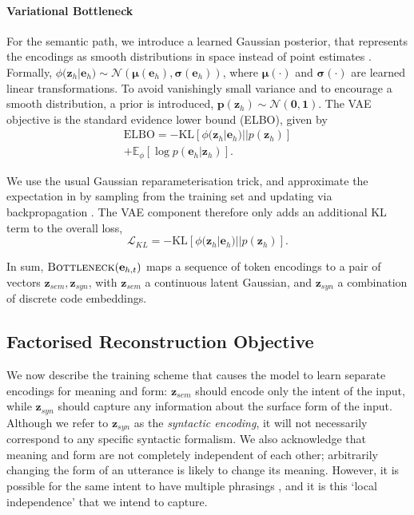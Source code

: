 \documentclass[11pt,a4paper]{article}
\begin{document}
\paragraph{Variational Bottleneck}

For the semantic path, we introduce a learned Gaussian posterior, that
represents the encodings as smooth distributions in space instead of
point estimates \cite{kingma2013autoencoding}.  Formally,
${\phi(\textbf{z}_h} | \textbf{e}_h ) \sim
\mathcal{N}(\boldsymbol{\mu}(\textbf{e}_h),
\boldsymbol{\sigma}(\textbf{e}_h))$, where $\boldsymbol{\mu} ( \cdot
)$ and $\boldsymbol{\sigma} ( \cdot )$ are learned linear
transformations. To avoid vanishingly small variance and to encourage
a smooth distribution, a prior is introduced,
$\textbf{p}(\textbf{z}_h) \sim \mathcal{N}(\textbf{0},
\textbf{1})$. The VAE objective is the standard evidence lower bound
(ELBO), given by
\begin{multline} \label{eq:vaeobjective}
    \text{ELBO} = - \text{KL} [ \phi(\textbf{z}_h | \textbf{e}_h )|| p(\textbf{z}_h )  ] \\
    + \mathbb{E}_{\phi}[ \log p(\textbf{e}_h | \textbf{z}_h ) ].
\end{multline}

We use the usual Gaussian reparameterisation trick, and approximate the expectation in
 by sampling from the training set and updating
via backpropagation \cite{kingma2013autoencoding}. The VAE component therefore only adds an
additional KL term to the overall loss,
\begin{equation}
    \mathcal{L}_{KL} = - \text{KL} [\phi(\textbf{z}_h | \textbf{e}_h )|| p(\textbf{z}_h )  ].
\end{equation}

In sum, $\textsc{Bottleneck}(\textbf{e}_{h,t})$ maps a sequence of
token encodings to a pair of vectors $\textbf{z}_{sem},
\textbf{z}_{syn}$, with $\textbf{z}_{sem}$ a continuous latent
Gaussian, and $\textbf{z}_{syn}$ a combination of discrete code
embeddings.



\subsection{Factorised Reconstruction Objective}
\label{sec:training}

We now describe the training scheme that causes the model to learn
separate encodings for meaning and form: $\textbf{z}_{sem}$ should
encode only the intent of the input, while $\textbf{z}_{syn}$ should
capture any information about the surface form of the input. Although
we refer to $\textbf{z}_{syn}$ as the \textit{syntactic encoding}, it
will not necessarily correspond to any specific syntactic
formalism. We also acknowledge that meaning and form are not
completely independent of each other; arbitrarily changing the form of
an utterance is likely to change its meaning. However, it is possible
for the same intent to have multiple phrasings , and it is this `local
independence' that we intend to capture.
\end{document}
